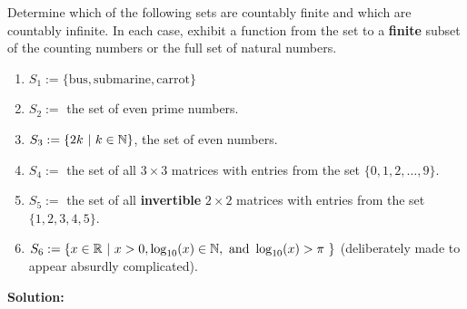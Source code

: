 \begin{example} 
\label{ex:CountableSets}
Determine which of the following sets are countably finite and which are countably infinite. In each case, exhibit a function from the set to a \textbf{finite} subset of the counting numbers or the full set of natural numbers.

    \begin{enumerate}
\renewcommand{\labelenumi}{(\alph{enumi})}
\setlength{\itemsep}{.2cm}

\item $S_1:=\{\text{bus}, \text{submarine},  \text{carrot}\}$

\item $S_2:=$ the set of even prime numbers.

\item $S_3 := \{ 2k~|~ k \in \mathbb N\}$, the set of even numbers.

\item $S_4:=$ the set of all $3 \times 3$ matrices with entries from the set $\{0, 1, 2, \ldots, 9\}$.

\item $S_5:=$ the set of all \textbf{invertible} $2 \times 2$ matrices with entries from the set $\{1, 2, 3, 4, 5\}$.

\item $S_6:=\{ x \in \mathbb R~|~ x>0, \log_{10}(x) \in \mathbb N, \text{ and }  \log_{10}(x)>\pi~\}$ (deliberately made to appear absurdly complicated).

\end{enumerate}
    
\end{example}

\textbf{Solution:}

